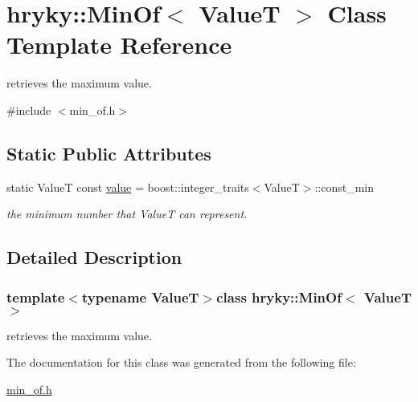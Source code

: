 \hypertarget{classhryky_1_1_min_of}{\section{hryky\-:\-:Min\-Of$<$ Value\-T $>$ Class Template Reference}
\label{classhryky_1_1_min_of}
}


retrieves the maximum value.  




{\ttfamily \#include $<$min\-\_\-of.\-h$>$}

\subsection*{Static Public Attributes}
\begin{DoxyCompactItemize}
\item 
\hypertarget{classhryky_1_1_min_of_a1bd351b969c43e1cf591ae396045b964}{static Value\-T const \hyperlink{classhryky_1_1_min_of_a1bd351b969c43e1cf591ae396045b964}{value} = boost\-::integer\-\_\-traits$<$Value\-T$>$\-::const\-\_\-min}\label{classhryky_1_1_min_of_a1bd351b969c43e1cf591ae396045b964}

\begin{DoxyCompactList}\small\item\em the minimum number that Value\-T can represent. \end{DoxyCompactList}\end{DoxyCompactItemize}


\subsection{Detailed Description}
\subsubsection*{template$<$typename Value\-T$>$class hryky\-::\-Min\-Of$<$ Value\-T $>$}

retrieves the maximum value. 

The documentation for this class was generated from the following file\-:\begin{DoxyCompactItemize}
\item 
\hyperlink{min__of_8h}{min\-\_\-of.\-h}\end{DoxyCompactItemize}
